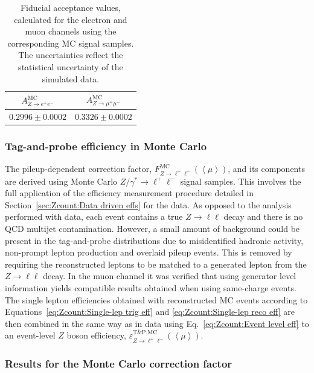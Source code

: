 \begin{table}[!htb]
	\centering
	\begin{tabular}{@{}cc@{}}
		\toprule
		$A^\text{MC}_{Z\rightarrow e^+e^-}$    & $A^\text{MC}_{Z\rightarrow \mu^+\mu^-}$    \\ \midrule
		$0.2996\pm0.0002$ & $0.3326\pm0.0002$ \\ \bottomrule
	\end{tabular}
	\caption{Fiducial acceptance values, calculated for the electron and muon channels using the corresponding MC signal samples. The uncertainties reflect the statistical uncertainty of the simulated data.}
	\label{tab:Zcount:MC acceptance}
\end{table}

\subsubsection{Tag-and-probe efficiency in Monte Carlo}
\label{sec:Zcount:tag-and-probe MC}

The pileup-dependent correction factor, $F^\text{MC}_{Z\rightarrow \ell^+\ell^-}(\left< \mu \right>)$, and its components are derived using Monte Carlo $Z/\gamma^*\rightarrow\ell^+\ell^-$ signal samples. This involves the full application of the efficiency measurement procedure detailed in Section~\ref{sec:Zcount:Data driven effs} for the data. As opposed to the analysis performed with data, each event contains a true $Z\rightarrow\ell\ell$ decay and there is no QCD multijet contamination. However, a small amount of background could be present in the tag-and-probe distributions due to misidentified hadronic activity, non-prompt lepton production and overlaid pileup events. This is removed by requiring the reconstructed leptons to be matched to a generated lepton from the $Z\rightarrow\ell\ell$ decay. In the muon channel it was verified that using generator level information yields compatible results obtained when using same-charge events. The single lepton efficiencies obtained with reconstructed MC events according to Equations~\ref{eq:Zcount:Single-lep trig eff} and \ref{eq:Zcount:Single-lep reco eff} are then combined in the same way as in data using Eq.~\ref{eq:Zcount:Event level eff} to an event-level $Z$ boson efficiency, $\varepsilon^\text{T\&P,MC}_{Z\rightarrow \ell^+\ell^-}(\left< \mu \right>)$.

\subsubsection{Results for the Monte Carlo correction factor}

